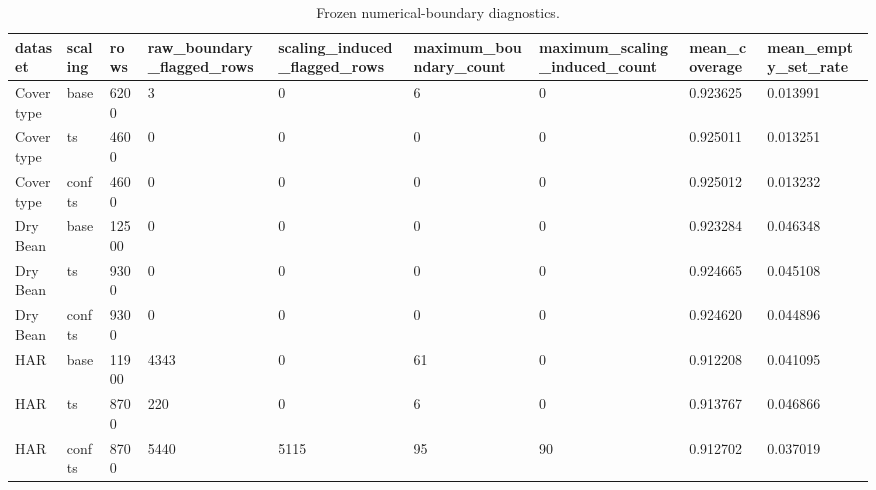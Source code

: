 \begin{table}[t]
\centering
\caption{Frozen numerical-boundary diagnostics.}
\label{tab:numerical-diagnostics}
\begin{tabular}{lllllllll}
\hline
dataset & scaling & rows & raw\_boundary\_flagged\_rows & scaling\_induced\_flagged\_rows & maximum\_boundary\_count & maximum\_scaling\_induced\_count & mean\_coverage & mean\_empty\_set\_rate \\
\hline
Covertype & base & 6200 & 3 & 0 & 6 & 0 & 0.923625 & 0.013991 \\
Covertype & ts & 4600 & 0 & 0 & 0 & 0 & 0.925011 & 0.013251 \\
Covertype & confts & 4600 & 0 & 0 & 0 & 0 & 0.925012 & 0.013232 \\
Dry Bean & base & 12500 & 0 & 0 & 0 & 0 & 0.923284 & 0.046348 \\
Dry Bean & ts & 9300 & 0 & 0 & 0 & 0 & 0.924665 & 0.045108 \\
Dry Bean & confts & 9300 & 0 & 0 & 0 & 0 & 0.924620 & 0.044896 \\
HAR & base & 11900 & 4343 & 0 & 61 & 0 & 0.912208 & 0.041095 \\
HAR & ts & 8700 & 220 & 0 & 6 & 0 & 0.913767 & 0.046866 \\
HAR & confts & 8700 & 5440 & 5115 & 95 & 90 & 0.912702 & 0.037019 \\
\hline
\end{tabular}
\end{table}
